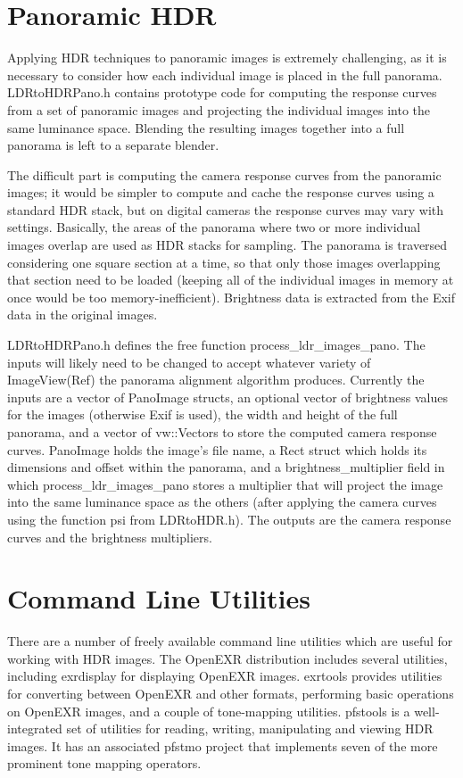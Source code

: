 \section{Panoramic HDR}
Applying HDR techniques to panoramic images is extremely challenging,
as it is necessary to consider how each individual image is placed in
the full panorama.  LDRtoHDRPano.h contains prototype code for
computing the response curves from a set of panoramic images and
projecting the individual images into the same luminance
space. Blending the resulting images together into a full panorama is
left to a separate blender.

The difficult part is computing the camera response curves from the
panoramic images; it would be simpler to compute and cache the
response curves using a standard HDR stack, but on digital cameras the
response curves may vary with settings. Basically, the areas of the
panorama where two or more individual images overlap are used as HDR
stacks for sampling. The panorama is traversed considering one square
section at a time, so that only those images overlapping that section
need to be loaded (keeping all of the individual images in memory at
once would be too memory-inefficient).  Brightness data is extracted
from the Exif data in the original images.

LDRtoHDRPano.h defines the free function
process\_ldr\_images\_pano. The inputs will likely need to be changed
to accept whatever variety of ImageView(Ref) the panorama alignment
algorithm produces. Currently the inputs are a vector of PanoImage
structs, an optional vector of brightness values for the images
(otherwise Exif is used), the width and height of the full panorama,
and a vector of vw::Vectors to store the computed camera response
curves. PanoImage holds the image's file name, a Rect struct which
holds its dimensions and offset within the panorama, and a
brightness\_multiplier field in which process\_ldr\_images\_pano
stores a multiplier that will project the image into the same
luminance space as the others (after applying the camera curves using
the function psi from LDRtoHDR.h). The outputs are the camera response
curves and the brightness multipliers.

\section{Command Line Utilities}
There are a number of freely available command line utilities which are useful for working
with HDR images. The OpenEXR distribution \cite{openexr} includes several utilities,
including exrdisplay for displaying OpenEXR images. exrtools \cite{exrtools} provides
utilities for converting between OpenEXR and other formats, performing basic operations
on OpenEXR images, and a couple of tone-mapping utilities. pfstools \cite{pfstools} is a
well-integrated set of utilities for reading, writing, manipulating and viewing HDR images.
It has an associated pfstmo project that implements seven of the more prominent tone
mapping operators.

